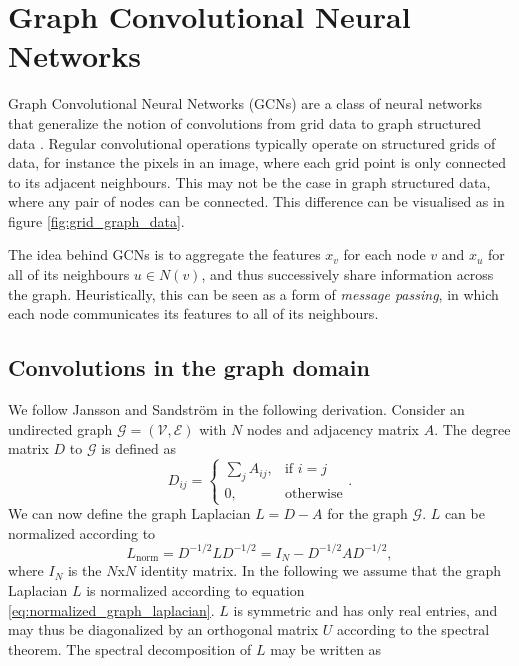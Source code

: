 \section{Graph Convolutional Neural Networks}

Graph Convolutional Neural Networks (GCNs) are a class of neural networks that generalize the notion of convolutions from grid data to graph structured data \cite{wu_review}. Regular convolutional operations typically operate on structured grids of data, for instance the pixels in an image, where each grid point is only connected to its adjacent neighbours. This may not be the case in graph structured data, where any pair of nodes can be connected. This difference can be visualised as in figure \ref{fig:grid_graph_data}. 

The idea behind GCNs is to aggregate the features $x_v$ for each node $v$ and $x_u$ for all of its neighbours $u \in N(v)$, and thus successively share information across the graph. Heuristically, this can be seen as a form of \textit{message passing}, in which each node communicates its features to all of its neighbours. 

\subsection{Convolutions in the graph domain}

We follow Jansson and Sandström \cite{jansson_sandstrom} in the following derivation. Consider an undirected graph $\mathcal{G} = (\mathcal{V}, \mathcal{E})$ with $N$ nodes and adjacency matrix $A$. The degree matrix $D$ to $\mathcal{G}$ is defined as 
\begin{equation}
    D_{ij} = \begin{cases} \sum_j A_{ij}, & \mbox{if } i = j \\ \mbox{0,} & \mbox{otherwise} \end{cases}.
    \label{eq:degreematrixdefinition}
\end{equation}
We can now define the graph Laplacian $L= D-A $ for the graph $\mathcal{G}$. $L$ can be normalized according to 
\begin{equation}
    L_\text{norm} = D^{-1/2} L D^{-1/2} =  I_N - D^{-1/2} A D^{-1/2},
    \label{eq:normalized_graph_laplacian}
\end{equation}
where $I_N$ is the $N$x$N$ identity matrix. In the following we assume that the graph Laplacian $L$ is normalized according to equation \eqref{eq:normalized_graph_laplacian}. $L$ is symmetric and has only real entries, and may thus be diagonalized by an orthogonal matrix $U$ according to the spectral theorem. The spectral decomposition of $L$ may be written as 

